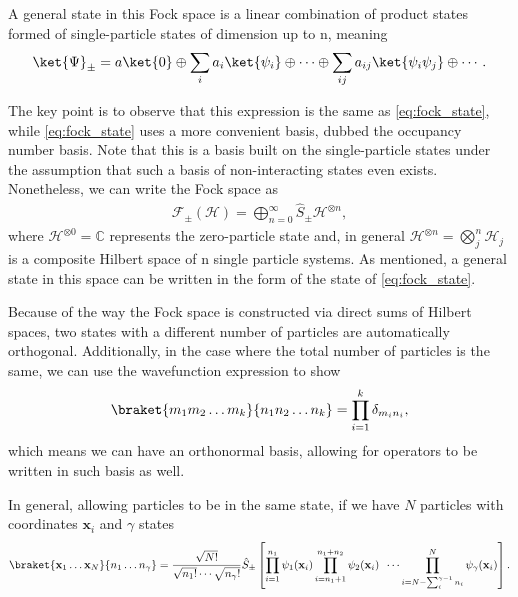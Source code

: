 A general state in this Fock space is a linear combination of product states formed of single-particle states of dimension up to n, meaning
\begin{align*}
    \ket{\Psi}_\pm = a\ket{0} \oplus \sum_i a_i\ket{\psi_i} \oplus \cdots \oplus \sum_{ij} a_{ij}\ket{\psi_i\psi_j} \oplus \cdots.
\end{align*}

The key point is to observe that this expression is the same as \eqref{eq:fock_state}, while \eqref{eq:fock_state} uses a more convenient basis, dubbed the occupancy number basis.
Note that this is a basis built on the single-particle states under the assumption that such a basis of non-interacting states even exists. Nonetheless, we can write the Fock space as 
\begin{align*}
    \mathcal{F}_{\pm}(\mathcal{H}) = \bigoplus_{n=0}^{\infty} \hat{S}_{\pm} \mathcal{H}^{\otimes n},
\end{align*}
where $\mathcal{H}^{\otimes 0} = \mathbb{C}$ represents the zero-particle state and, in general $\mathcal{H}^{\otimes n} = \bigotimes_j^n \mathcal{H}_j$ is a composite Hilbert space of n single particle systems. As mentioned, a general state in this space can be written in the form of the state of \eqref{eq:fock_state}.

Because of the way the Fock space is constructed via direct sums of Hilbert spaces, two states with a different number of particles are automatically orthogonal. Additionally, in the case where the total number of particles is the same, we can use the wavefunction expression to show
\begin{align*}
    \braket{m_1m_2\ldots m_k}{n_1n_2\ldots n_k} = \prod_{i=1}^k\delta_{m_in_i},
\end{align*}
which means we can have an orthonormal basis, allowing for operators to be written in such basis as well.

In general, allowing particles to be in the same state, if we have $N$ particles with coordinates $\mathbf{x}_i$ and $\gamma$ states
\begin{align}
    \braket{\mathbf{x}_1 \dots \mathbf{x}_N}{n_1 \dots n_\gamma} = \frac{\sqrt{N!}}{\sqrt{n_1!}\cdots\sqrt{n_\gamma!}}\hat{S}_{\pm}\left[
                                \prod^{n_1}_{i=1} \psi_1(\mathbf{x}_i) \prod^{n_1 + n_2}_{i=n_1 + 1} \psi_2(\mathbf{x}_i)\enspace\cdots \prod^{N}_{i=N - \sum_i^{\gamma-1} n_i}  \psi_\gamma(\mathbf{x}_i)\right]\label{eq:general_sp_prods}.
\end{align}


